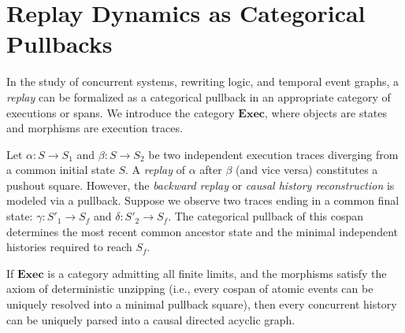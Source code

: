 \section{Replay Dynamics as Categorical Pullbacks}

In the study of concurrent systems, rewriting logic, and temporal event graphs, a \emph{replay} can be formalized as a categorical pullback in an appropriate category of executions or spans. We introduce the category $\mathbf{Exec}$, where objects are states and morphisms are execution traces.

\begin{definition}
Let $\alpha: S \to S_1$ and $\beta: S \to S_2$ be two independent execution traces diverging from a common initial state $S$. A \emph{replay} of $\alpha$ after $\beta$ (and vice versa) constitutes a pushout square. However, the \emph{backward replay} or \emph{causal history reconstruction} is modeled via a pullback. 
Suppose we observe two traces ending in a common final state: $\gamma: S'_1 \to S_f$ and $\delta: S'_2 \to S_f$. The categorical pullback of this cospan determines the most recent common ancestor state and the minimal independent histories required to reach $S_f$.
\end{definition}

\begin{theorem}
If $\mathbf{Exec}$ is a category admitting all finite limits, and the morphisms satisfy the axiom of deterministic unzipping (i.e., every cospan of atomic events can be uniquely resolved into a minimal pullback square), then every concurrent history can be uniquely parsed into a causal directed acyclic graph.
\end{theorem}


